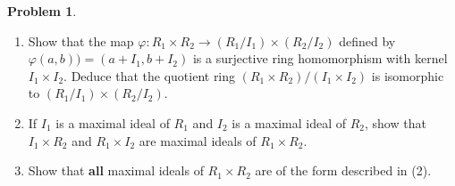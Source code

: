 \documentclass[11pt]{article}
\theoremstyle{definition}
\newtheorem{prob}[thm]{Problem}
\numberwithin{equation}{section}
\begin{document}
\begin{prob}
\begin{enumerate}
    \item Show that the map $\varphi:R_{1} \times R_{2} \rightarrow (R_{1}/I_{1}) \times (R_{2}/I_{2})$ defined by $\varphi(a, b)) = (a+I_{1}, b+I_{2})$ is a surjective ring homomorphism with kernel $I_{1} \times I_{2}$. Deduce that the quotient ring $(R_{1} \times R_{2})/(I_{1} \times I_{2})$ is isomorphic to $(R_{1}/I_{1}) \times (R_{2}/I_{2})$.
    \item If $I_{1}$ is a maximal ideal of $R_{1}$ and $I_{2}$ is a maximal ideal of $R_{2}$, show that $I_{1} \times R_{2}$ and $R_{1} \times I_{2}$ are maximal ideals of $R_{1} \times R_{2}$.
    \item Show that \textbf{all} maximal ideals of $R_{1} \times R_{2}$ are of the form described in (2).
\end{enumerate}
\end{prob}
\end{document}
